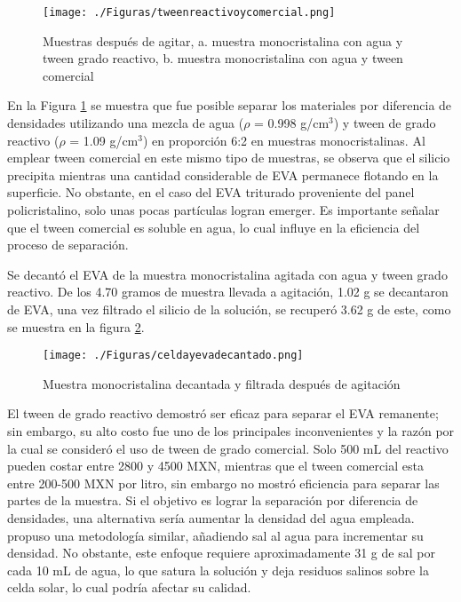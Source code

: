 \begin{figure}[htb]
	\begin{center}
		\texttt{[image: ./Figuras/tweenreactivoycomercial.png]}
	\end{center}
	\vspace{-1em} %
	\caption{Muestras después de agitar, a. muestra monocristalina con agua y tween grado reactivo, b. muestra monocristalina con agua y tween comercial}
	\label{fig:tweenreactivovscomercial}
\end{figure}


En la Figura \ref{fig:tweenreactivovscomercial} se muestra que fue posible separar los materiales por diferencia de densidades utilizando una mezcla de agua ($\rho$ = 0.998 g/cm$^{3}$) y tween de grado reactivo ($\rho$ = 1.09 g/cm$^{3}$) en proporción 6:2 en muestras monocristalinas. Al emplear tween comercial en este mismo tipo de muestras, se observa que el silicio precipita mientras una cantidad considerable de EVA permanece flotando en la superficie. No obstante, en el caso del EVA triturado proveniente del panel policristalino, solo unas pocas partículas logran emerger. Es importante señalar que el tween comercial es soluble en agua, lo cual influye en la eficiencia del proceso de separación.

Se decantó el EVA de la muestra monocristalina agitada con agua y tween grado reactivo. De los 4.70 gramos de muestra llevada a agitación, 1.02 g se decantaron de EVA, una vez filtrado el silicio de la solución, se recuperó 3.62 g de este, como se muestra en la figura \ref{fig:celdayevadecantado}.

\begin{figure}[htb]
	\begin{center}
		\texttt{[image: ./Figuras/celdayevadecantado.png]}
	\end{center}
	\vspace{-1em} %
	\caption{Muestra monocristalina decantada y filtrada después de agitación}
	\label{fig:celdayevadecantado}
\end{figure}

El tween de grado reactivo demostró ser eficaz para separar el EVA remanente; sin embargo, su alto costo fue uno de los principales inconvenientes y la razón por la cual se consideró el uso de tween de grado comercial. Solo 500 mL del reactivo pueden costar entre 2800 y 4500 MXN, mientras que el tween comercial esta entre 200-500 MXN por litro, sin embargo no mostró eficiencia para separar las partes de la muestra. Si el objetivo es lograr la separación por diferencia de densidades, una alternativa sería aumentar la densidad del agua empleada. \citet{Azeumo2019} propuso una metodología similar, añadiendo sal al agua para incrementar su densidad. No obstante, este enfoque requiere aproximadamente 31 g de sal por cada 10 mL de agua, lo que satura la solución y deja residuos salinos sobre la celda solar, lo cual podría afectar su calidad. 

